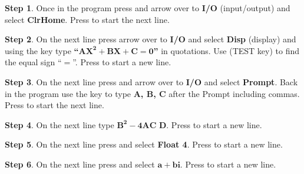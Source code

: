 \documentclass{report}
\theoremstyle{definition}
\newtheorem{step}{\textbf{Step}}
\begin{document}
\vspace{-0.25cm}

\begin{step}
Once in the program press  and arrow over to \textbf{I/O} (input/output) and select \textbf{ClrHome}. Press  to start the next line. 
\end{step}

\vspace{-0.25cm}

\begin{step}
On the next line press  arrow over to \textbf{I/O} and select \textbf{Disp} (display) and using the  key type \textbf{``}$\mathbf{AX^2+BX+C=0}$\textbf{''} in quotations. Use   (TEST key) to find the equal sign ``$=$''. Press  to start a new line.
\end{step}

\vspace{-0.25cm}

\begin{step}
On the next line press  and arrow over to \textbf{I/O} and select \textbf{Prompt}. Back in the program use the   key to type \textbf{A, B, C} after the Prompt including commas. Press  to start the next line. 
\end{step}

\vspace{-0.25cm}

\begin{step}
On the next line type $\mathbf{B^2-4AC}$  $\mathbf{D}$.  Press  to start a new line.  
\end{step}

\vspace{-0.25cm}

\begin{step}
On the next line press  and select \textbf{Float 4}. Press  to start a new line.
\end{step}


\begin{step}
On the next line press  and select $\mathbf{a+bi}$. Press  to start a new line.
\end{step}
\end{document}
